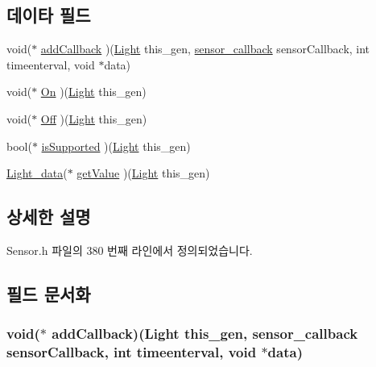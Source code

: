 \subsection*{데이타 필드}
\begin{DoxyCompactItemize}
\item 
void($\ast$ \hyperlink{struct___light_a5c74ab5e1abaf06b4188b922d3646e6c}{add\-Callback} )(\hyperlink{_sensor_8h_a51c7b02c797bd458035bde93d4cf87e8}{Light} this\-\_\-gen, \hyperlink{_sensor_8h_ad8114207845fc5e0aa30832f0c718cd6}{sensor\-\_\-callback} sensor\-Callback, int timeenterval, void $\ast$data)
\item 
void($\ast$ \hyperlink{struct___light_a5c0d86bf418b917aa9aa5a9eed12dcca}{On} )(\hyperlink{_sensor_8h_a51c7b02c797bd458035bde93d4cf87e8}{Light} this\-\_\-gen)
\item 
void($\ast$ \hyperlink{struct___light_a774f07653a84b4ea9c2a31db11fd7281}{Off} )(\hyperlink{_sensor_8h_a51c7b02c797bd458035bde93d4cf87e8}{Light} this\-\_\-gen)
\item 
bool($\ast$ \hyperlink{struct___light_a26d33e377912ff1d4fc10f17c512231b}{is\-Supported} )(\hyperlink{_sensor_8h_a51c7b02c797bd458035bde93d4cf87e8}{Light} this\-\_\-gen)
\item 
\hyperlink{_sensor_8h_a457745a8acf045e2ed86752fb84543f4}{Light\-\_\-data}($\ast$ \hyperlink{struct___light_a167b8ee698bc8f2db75089756d4d58d3}{get\-Value} )(\hyperlink{_sensor_8h_a51c7b02c797bd458035bde93d4cf87e8}{Light} this\-\_\-gen)
\end{DoxyCompactItemize}


\subsection{상세한 설명}


Sensor.\-h 파일의 380 번째 라인에서 정의되었습니다.



\subsection{필드 문서화}
\hypertarget{struct___light_a5c74ab5e1abaf06b4188b922d3646e6c}{
\subsubsection[{add\-Callback}]{\setlength{\rightskip}{0pt plus 5cm}void($\ast$  add\-Callback)({\bf Light} this\-\_\-gen, {\bf sensor\-\_\-callback} sensor\-Callback, int timeenterval, void $\ast$data)}}\label{struct___light_a5c74ab5e1abaf06b4188b922d3646e6c}


